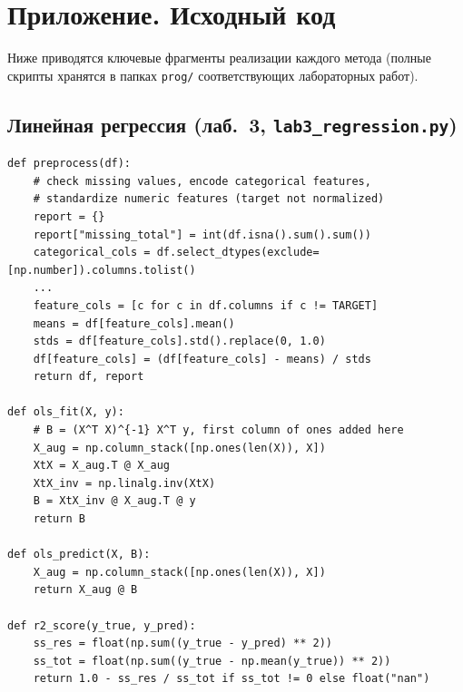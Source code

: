 \documentclass[12pt,a4paper]{article}
\begin{document}
\section{Приложение. Исходный код}
Ниже приводятся ключевые фрагменты реализации каждого метода (полные скрипты хранятся в папках \texttt{prog/} соответствующих лабораторных работ).

\subsection{Линейная регрессия (лаб.~3, \texttt{lab3\_regression.py})}
\begin{lstlisting}
def preprocess(df):
    # check missing values, encode categorical features,
    # standardize numeric features (target not normalized)
    report = {}
    report["missing_total"] = int(df.isna().sum().sum())
    categorical_cols = df.select_dtypes(exclude=[np.number]).columns.tolist()
    ...
    feature_cols = [c for c in df.columns if c != TARGET]
    means = df[feature_cols].mean()
    stds = df[feature_cols].std().replace(0, 1.0)
    df[feature_cols] = (df[feature_cols] - means) / stds
    return df, report

def ols_fit(X, y):
    # B = (X^T X)^{-1} X^T y, first column of ones added here
    X_aug = np.column_stack([np.ones(len(X)), X])
    XtX = X_aug.T @ X_aug
    XtX_inv = np.linalg.inv(XtX)
    B = XtX_inv @ X_aug.T @ y
    return B

def ols_predict(X, B):
    X_aug = np.column_stack([np.ones(len(X)), X])
    return X_aug @ B

def r2_score(y_true, y_pred):
    ss_res = float(np.sum((y_true - y_pred) ** 2))
    ss_tot = float(np.sum((y_true - np.mean(y_true)) ** 2))
    return 1.0 - ss_res / ss_tot if ss_tot != 0 else float("nan")
\end{lstlisting}
\end{document}
